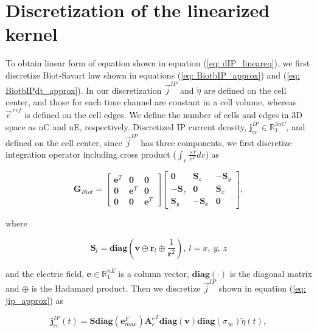 \documentclass[extra,mreferee]{gji}
\newcommand{\siginf}{\sigma_\infty}
\newcommand{\Ace}{{\mathbf A_c^e}}
\newcommand{\diag}{\mathbf{diag}}
\renewcommand {\j}  { {\vec j} }
\newcommand {\e}  { {\vec e} }
\renewcommand {\dj}  { {\mathbf{j} } }
\newcommand {\de}  { {\mathbf{e} } }
\newcommand{\vol}{\mathbf{v}}
\newcommand{\peta}{\tilde{\eta}}
\newcommand{\eref}{\e^{\ ref}}
\begin{document}
\section{Discretization of the linearized kernel}
\label{section:linearkernel_discrete}
To obtain linear form of equation shown in equation (\ref{eq: dIP_lineareq}),
we first discretize Biot-Savart law shown in equations (\ref{eq: BiotbIP_approx}) and (\ref{eq: BiotbIPdt_approx}). In our discretization $\j^{IP}$ and  $\peta$ are defined on the cell center, and those for each time channel are constant in a cell volume, whereas $\eref$ is defined on the cell edges. 
We define the number of cells and edges in 3D space as nC and nE, respectively. Discretized IP current density, $\dj^{IP}_{cc} \in \mathbb{R}^{3nC}_{1}$, and defined on the cell center, since $\j^{IP}$ has three components, we first discretize integration operator including cross product ($\int_{v}\frac{ \times \hat{r}}{r^2}dv$) as
\begin{linenomath*}
\begin{equation}
  \mathbf{G}_{Biot} =
  \begin{bmatrix}
       \mathbf{e}^T &  \mathbf{0}   & \mathbf{0}  \\
       \mathbf{0}   &  \mathbf{e}^T & \mathbf{0}  \\
       \mathbf{0}   &  \mathbf{0}   & \mathbf{e}^T
    \end{bmatrix}
  \begin{bmatrix}
       \mathbf{0}     &   \mathbf{S}_z   & -\mathbf{S}_y  \\
      -\mathbf{S}_z   &   \mathbf{0}     &  \mathbf{S}_x  \\
       \mathbf{S}_y   &  -\mathbf{S}_x   &  \mathbf{0}
    \end{bmatrix},
\end{equation}
\end{linenomath*}
where
\begin{linenomath*}
\begin{equation*}
  \mathbf{S}_l =\diag(\mathbf{v}\oplus \mathbf{r}_l \oplus \frac{1}{\mathbf{r}^2}), \ l = x, \ y, \ z
\end{equation*}
\end{linenomath*}
and the electric field, $\mathbf{e} \in \mathbb{R}^{nE}_1$ is a column vector, $\diag(\cdot)$ is the diagonal matrix and $\oplus$ is the Hadamard product. 
Then we discretize $\j^{IP}$ shown in equation (\ref{eq: jip_approx}) as
\begin{linenomath*}
\begin{equation}
  \dj^{IP}_{cc}(t) = \mathbf{S}\diag(\de^{F}_{max})\Ace^T\diag(\vol)\diag(\siginf)\peta(t),
\end{equation}
\end{linenomath*}
\end{document}
